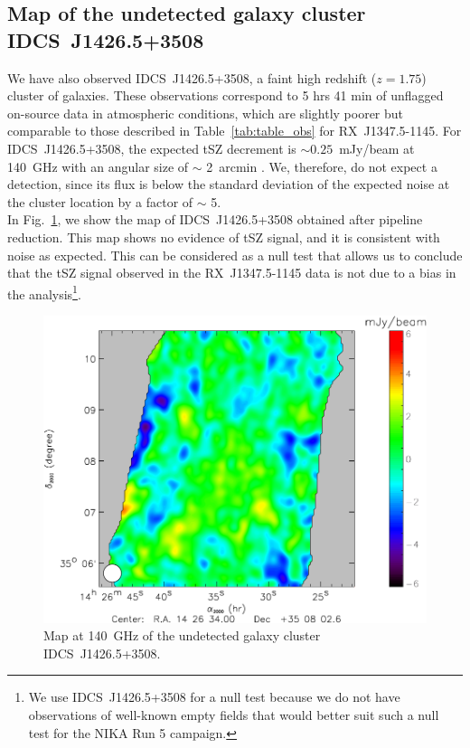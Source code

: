  \subsection{Map of the undetected galaxy cluster IDCS~J1426.5+3508}
 \label{sec:undetec_source}
We have also observed \mbox{IDCS~J1426.5+3508}, a faint high redshift ($z=1.75$) cluster of galaxies. These observations correspond to 5 hrs 41 min of unflagged on-source data in atmospheric conditions, which are slightly poorer but comparable to those described in Table~\ref{tab:table_obs} for \mbox{RX~J1347.5-1145}. For \mbox{IDCS~J1426.5+3508}, the expected tSZ decrement is $\sim 0.25$~mJy/beam at 140~GHz with an angular size of $\sim$ 2~arcmin \citep{idcs}. We, therefore, do not expect a detection, since its flux is below the standard deviation of the expected noise at the cluster location by a factor of $\sim$ 5. \\

In Fig.~\ref{fig:IDCS_J1426}, we show the map of \mbox{IDCS~J1426.5+3508} obtained after pipeline reduction. This map shows no evidence of tSZ signal, and it is consistent with noise as expected. 
This can be considered as a null test that allows us to conclude that the tSZ signal observed in the \mbox{RX~J1347.5-1145} data is not due to a bias in the analysis\footnote{We use \mbox{IDCS~J1426.5+3508} for a null test because we do not have observations of well-known empty fields that would better suit such a null test for the NIKA Run 5 campaign.}.

\begin{figure}
\centering
\includegraphics[width=\columnwidth]{Figure/IDCS_J1426}
\caption{Map at 140~GHz of the undetected galaxy cluster \mbox{IDCS~J1426.5+3508}.}
\label{fig:IDCS_J1426}
\end{figure}
	
	
